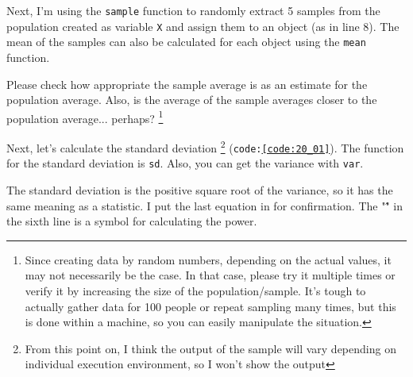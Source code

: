 \documentclass{ltjsbook}
\begin{document}
Next, I'm using the \texttt{sample} function to randomly extract 5 samples from the population created as variable \texttt{X} and assign them to an object (as in line 8). The mean of the samples can also be calculated for each object using the \texttt{mean} function.

Please check how appropriate the sample average is as an estimate for the population average. Also, is the average of the sample averages closer to the population average... perhaps? \footnote{Since creating data by random numbers, depending on the actual values, it may not necessarily be the case. In that case, please try it multiple times or verify it by increasing the size of the population/sample. It's tough to actually gather data for 100 people or repeat sampling many times, but this is done within a machine, so you can easily manipulate the situation.}

Next, let's calculate the standard deviation \footnote{From this point on, I think the output of the sample will vary depending on individual execution environment, so I won't show the output} (\texttt{code:\ref{code:20_01}}). The function for the standard deviation is \texttt{sd}. Also, you can get the variance with \texttt{var}.

The standard deviation is the positive square root of the variance, so it has the same meaning as a statistic. I put the last equation in for confirmation. The "\^" in the sixth line is a symbol for calculating the power.
\end{document}
